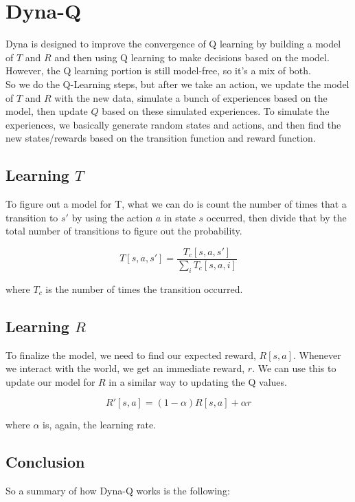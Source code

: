 \section{Dyna-Q}

\noindent Dyna is designed to improve the convergence of Q learning by building a model of $T$ and $R$ and then using Q learning to make decisions based on the model. However, the Q learning portion is still model-free, so it's a mix of both.\\

\noindent So we do the Q-Learning steps, but after we take an action, we update the model of $T$ and $R$ with the new data, simulate a bunch of experiences based on the model, then update $Q$ based on these simulated experiences. To simulate the experiences, we basically generate random states and actions, and then find the new states/rewards based on the transition function and reward function.

\subsection{Learning $T$}

\noindent To figure out a model for T, what we can do is count the number of times that a transition to $s'$ by using the action $a$ in state $s$ occurred, then divide that by the total number of transitions to figure out the probability.

\begin{equation}
T[s,a,s'] = \frac{T_c[s,a,s']}{\sum_{i} T_c[s,a,i]}
\end{equation}

\noindent where $T_c$ is the number of times the transition occurred.

\subsection{Learning $R$}

\noindent To finalize the model, we need to find our expected reward, $R[s,a]$. Whenever we interact with the world, we get an immediate reward, $r$. We can use this to update our model for $R$ in a similar way to updating the Q values.

\begin{equation}
R'[s,a] = (1-\alpha)R[s,a] + \alpha r
\end{equation}

\noindent where $\alpha$ is, again, the learning rate.

\subsection{Conclusion}
\noindent So a summary of how Dyna-Q works is the following:


